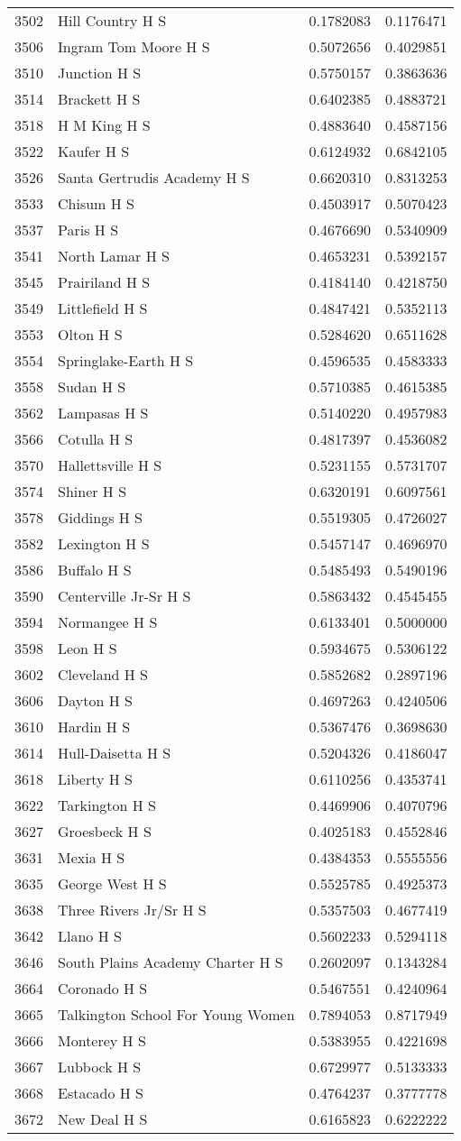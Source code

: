 \documentclass[
]{article}
\begin{document}
\begin{longtable}[]{@{}llrr@{}}
3502 & Hill Country H S & 0.1782083 & 0.1176471\tabularnewline
3506 & Ingram Tom Moore H S & 0.5072656 & 0.4029851\tabularnewline
3510 & Junction H S & 0.5750157 & 0.3863636\tabularnewline
3514 & Brackett H S & 0.6402385 & 0.4883721\tabularnewline
3518 & H M King H S & 0.4883640 & 0.4587156\tabularnewline
3522 & Kaufer H S & 0.6124932 & 0.6842105\tabularnewline
3526 & Santa Gertrudis Academy H S & 0.6620310 &
0.8313253\tabularnewline
3533 & Chisum H S & 0.4503917 & 0.5070423\tabularnewline
3537 & Paris H S & 0.4676690 & 0.5340909\tabularnewline
3541 & North Lamar H S & 0.4653231 & 0.5392157\tabularnewline
3545 & Prairiland H S & 0.4184140 & 0.4218750\tabularnewline
3549 & Littlefield H S & 0.4847421 & 0.5352113\tabularnewline
3553 & Olton H S & 0.5284620 & 0.6511628\tabularnewline
3554 & Springlake-Earth H S & 0.4596535 & 0.4583333\tabularnewline
3558 & Sudan H S & 0.5710385 & 0.4615385\tabularnewline
3562 & Lampasas H S & 0.5140220 & 0.4957983\tabularnewline
3566 & Cotulla H S & 0.4817397 & 0.4536082\tabularnewline
3570 & Hallettsville H S & 0.5231155 & 0.5731707\tabularnewline
3574 & Shiner H S & 0.6320191 & 0.6097561\tabularnewline
3578 & Giddings H S & 0.5519305 & 0.4726027\tabularnewline
3582 & Lexington H S & 0.5457147 & 0.4696970\tabularnewline
3586 & Buffalo H S & 0.5485493 & 0.5490196\tabularnewline
3590 & Centerville Jr-Sr H S & 0.5863432 & 0.4545455\tabularnewline
3594 & Normangee H S & 0.6133401 & 0.5000000\tabularnewline
3598 & Leon H S & 0.5934675 & 0.5306122\tabularnewline
3602 & Cleveland H S & 0.5852682 & 0.2897196\tabularnewline
3606 & Dayton H S & 0.4697263 & 0.4240506\tabularnewline
3610 & Hardin H S & 0.5367476 & 0.3698630\tabularnewline
3614 & Hull-Daisetta H S & 0.5204326 & 0.4186047\tabularnewline
3618 & Liberty H S & 0.6110256 & 0.4353741\tabularnewline
3622 & Tarkington H S & 0.4469906 & 0.4070796\tabularnewline
3627 & Groesbeck H S & 0.4025183 & 0.4552846\tabularnewline
3631 & Mexia H S & 0.4384353 & 0.5555556\tabularnewline
3635 & George West H S & 0.5525785 & 0.4925373\tabularnewline
3638 & Three Rivers Jr/Sr H S & 0.5357503 & 0.4677419\tabularnewline
3642 & Llano H S & 0.5602233 & 0.5294118\tabularnewline
3646 & South Plains Academy Charter H S & 0.2602097 &
0.1343284\tabularnewline
3664 & Coronado H S & 0.5467551 & 0.4240964\tabularnewline
3665 & Talkington School For Young Women & 0.7894053 &
0.8717949\tabularnewline
3666 & Monterey H S & 0.5383955 & 0.4221698\tabularnewline
3667 & Lubbock H S & 0.6729977 & 0.5133333\tabularnewline
3668 & Estacado H S & 0.4764237 & 0.3777778\tabularnewline
3672 & New Deal H S & 0.6165823 & 0.6222222\tabularnewline

\end{longtable}
\end{document}
